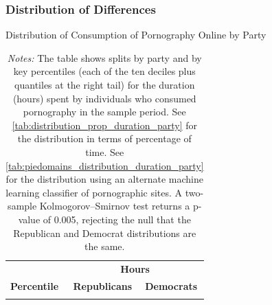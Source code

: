 \documentclass[12pt, letterpaper]{article}
\begin{document}
\subsubsection{Distribution of Differences}
\begin{table}[ht] \centering \small \setlength\tabcolsep{10 pt}
	\caption{Distribution of Consumption of Pornography Online by Party}
	\label{tab:distribution_duration_party}
	\begin{adjustbox}{max width=\textwidth}
		\begin{tabular}{crr}
			\toprule
			\multicolumn{1}{l}{\textbf{}}&\multicolumn{2}{c}{\textbf{Hours}}\\
			\cmidrule(l){2-3}
			\multicolumn{1}{l}{\textbf{Percentile}}&\multicolumn{1}{c}{\textbf{Republicans}}&\multicolumn{1}{c}{\textbf{Democrats}}\\
			\midrule
			\\
			\bottomrule
		\end{tabular}
	\end{adjustbox}
	\caption*{\footnotesize \emph{Notes:} 
		The table shows splits by party and by key percentiles (each of the ten deciles plus quantiles at the right tail) for the duration (hours) spent by individuals who consumed pornography in the sample period. 
		See \cref{tab:distribution_prop_duration_party} for the distribution in terms of percentage of time. 
		See \cref{tab:piedomains_distribution_duration_party} for the distribution using an alternate machine learning classifier of pornographic sites. 
		A two-sample Kolmogorov–Smirnov test returns a p-value of 0.005, rejecting the null that the Republican and Democrat distributions are the same.
	}
\end{table}
\end{document}
